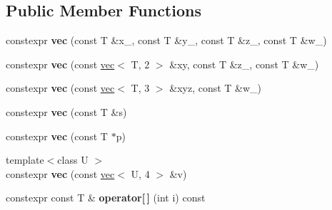 \subsection*{Public Member Functions}
\begin{DoxyCompactItemize}
\item 
constexpr {\bfseries vec} (const T \&x\+\_\+, const T \&y\+\_\+, const T \&z\+\_\+, const T \&w\+\_\+)\hypertarget{structlinalg_1_1vec_3_01T_00_014_01_4_a1384f960ade58a1eaa110411da5e66e2}{}\label{structlinalg_1_1vec_3_01T_00_014_01_4_a1384f960ade58a1eaa110411da5e66e2}

\item 
constexpr {\bfseries vec} (const \hyperlink{structlinalg_1_1vec}{vec}$<$ T, 2 $>$ \&xy, const T \&z\+\_\+, const T \&w\+\_\+)\hypertarget{structlinalg_1_1vec_3_01T_00_014_01_4_ab9a41f08fc740b65dd719976ab61ebc4}{}\label{structlinalg_1_1vec_3_01T_00_014_01_4_ab9a41f08fc740b65dd719976ab61ebc4}

\item 
constexpr {\bfseries vec} (const \hyperlink{structlinalg_1_1vec}{vec}$<$ T, 3 $>$ \&xyz, const T \&w\+\_\+)\hypertarget{structlinalg_1_1vec_3_01T_00_014_01_4_ae02054a25afe824f76be07ad4e07401f}{}\label{structlinalg_1_1vec_3_01T_00_014_01_4_ae02054a25afe824f76be07ad4e07401f}

\item 
constexpr {\bfseries vec} (const T \&s)\hypertarget{structlinalg_1_1vec_3_01T_00_014_01_4_afaa60d9eb56714aeb89a8a71064d6cc5}{}\label{structlinalg_1_1vec_3_01T_00_014_01_4_afaa60d9eb56714aeb89a8a71064d6cc5}

\item 
constexpr {\bfseries vec} (const T $\ast$p)\hypertarget{structlinalg_1_1vec_3_01T_00_014_01_4_a696635cdedadf67315ef9184edb00ef4}{}\label{structlinalg_1_1vec_3_01T_00_014_01_4_a696635cdedadf67315ef9184edb00ef4}

\item 
{\footnotesize template$<$class U $>$ }\\constexpr {\bfseries vec} (const \hyperlink{structlinalg_1_1vec}{vec}$<$ U, 4 $>$ \&v)\hypertarget{structlinalg_1_1vec_3_01T_00_014_01_4_abb8a97f384c71044ea5528d400c18a03}{}\label{structlinalg_1_1vec_3_01T_00_014_01_4_abb8a97f384c71044ea5528d400c18a03}

\item 
constexpr const T \& {\bfseries operator\mbox{[}$\,$\mbox{]}} (int i) const \hypertarget{structlinalg_1_1vec_3_01T_00_014_01_4_a9421cd4b92d01fc7bab857dfe8840665}{}\label{structlinalg_1_1vec_3_01T_00_014_01_4_a9421cd4b92d01fc7bab857dfe8840665}


\end{DoxyCompactItemize}
